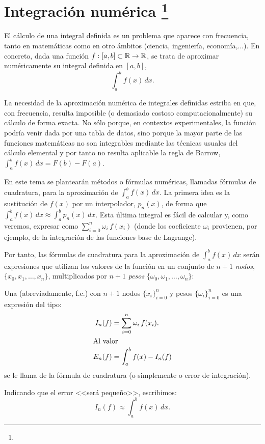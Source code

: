\newcommand{\ox}{\overline x}

\chapter[Integración numérica]{Integración numérica%
\footnote{\licenseInfo}}
\label{cha:integracion-numerica}

El cálculo de una integral definida es un problema que aparece con
frecuencia, tanto en matemáticas como en otro ámbitos (ciencia,
ingeniería, economía,...). En concreto, dada una función
$f:[a,b]\subset\operatorname{{\mathbb R}}\to\operatorname{{\mathbb R}}$, se trata de aproximar numéricamente su
integral definida en $[a,b]$,
\begin{equation*}
  \int_a^bf(x)\,dx.
\end{equation*}

La necesidad de la aproximación numérica de integrales definidas
estriba en que, con frecuencia, resulta imposible (o demasiado costoso
computacionalmente) su cálculo de forma exacta. No sólo porque, en
contextos experimentales, la función podría venir dada por una tabla
de datos, sino porque la mayor parte de las funciones matemáticas no
son integrables mediante las técnicas usuales del cálculo elemental
y por tanto no resulta aplicable la regla de Barrow, $\int_a^b f(x)\,
dx=F(b)-F(a)$.

En este tema se plantearán métodos o fórmulas numéricas, llamadas
fórmulas de cuadratura, para la aproximación de $\int_a^b f(x)\,
dx$. La primera idea es la sustitución de $f(x)$ por un interpolador,
$p_n(x)$, de forma que $\int_a^bf(x)\,dx \approx \int_a^b p_n(x)\,
dx$. Esta última integral es fácil de calcular y, como veremos,
expresar como $\sum_{i=0}^n \omega_i \, f(x_i)$ (donde los coeficiente
$\omega_i$ provienen, por ejemplo, de la integración de las
funciones base de Lagrange).


Por tanto, las fórmulas de cuadratura para la aproximación de
$\int_a^b f(x)\, dx$ serán expresiones que utilizan los valores de la
función en un conjunto de $n+1$ \emph{nodos}, $\{x_0,x_1,\dots,x_n\}$,
multiplicados por $n+1$ \emph{pesos}
$\{\omega_0,\omega_1,\dots,\omega_n\}$:
\begin{definition}
  \label{def:formula-cuadratura}
  Una  (abreviadamente, f.c.) con
  $n+1$ nodos $\{x_i\}_{i=0}^n$ y pesos $\{\omega_i\}_{i=0}^n$ es una
  expresión del tipo:
  \begin{align}
    \label{eq:f.cuadratura}
    I_n(f)&=\sum_{i=0}^n \omega_i \, f(x_i).
    \\
    \intertext{Al valor}
    \notag
    E_n(f) &= \int_a^b f(x) - I_n(f) 
  \end{align}
  se le llama  de la fórmula de cuadratura (o
  simplemente  o error de integración). 
\end{definition}
Indicando que el error <<será pequeño>>, escribimos:
\begin{equation*}
  I_n(f) \approx \int_a^b f(x)\, dx.
\end{equation*}

